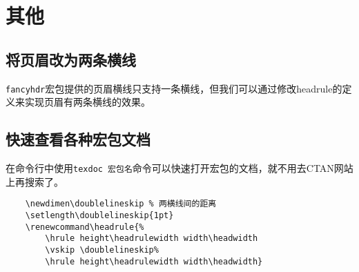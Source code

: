 \zhtoday\zhcurrtime
\section{其他}
\subsection{将页眉改为两条横线}
\lstinline|fancyhdr|宏包提供的页眉横线只支持一条横线，但我们可以通过修改headrule的定义来实现页眉有两条横线的效果。
\subsection{快速查看各种宏包文档}
在命令行中使用\lstinline|texdoc 宏包名|命令可以快速打开宏包的文档，就不用去CTAN网站上再搜索了。

\begin{lstlisting}
	\newdimen\doublelineskip % 两横线间的距离
	\setlength\doublelineskip{1pt}
	\renewcommand\headrule{%
		\hrule height\headrulewidth width\headwidth
		\vskip \doublelineskip%
		\hrule height\headrulewidth width\headwidth}
\end{lstlisting}
